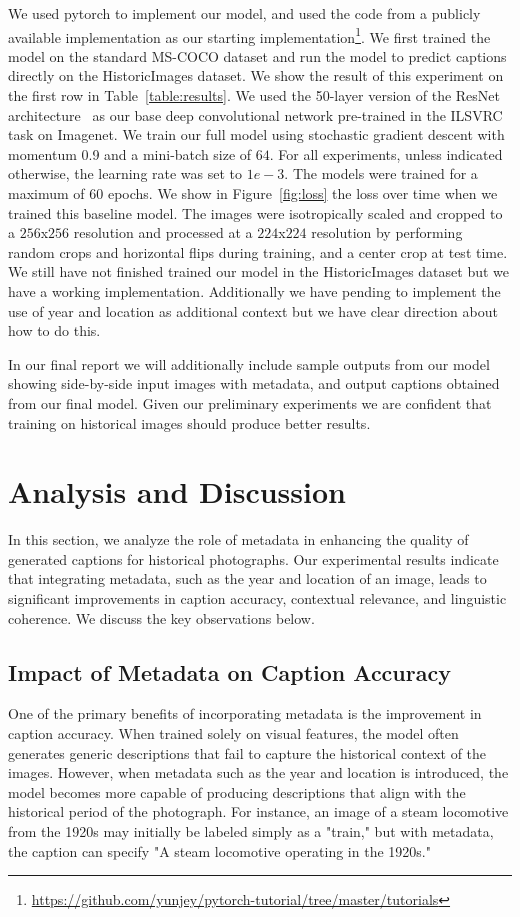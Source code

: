 \documentclass[10pt,twocolumn,letterpaper]{article}
\begin{document}
We used pytorch to implement our model, and used the code from a publicly available implementation as our starting implementation\footnote{\url{https://github.com/yunjey/pytorch-tutorial/tree/master/tutorials}}. We first trained the model on the standard MS-COCO dataset and run the model to predict captions directly on the HistoricImages dataset. We show the result of this experiment on the first row in Table~\ref{table:results}. We used the 50-layer version of the ResNet architecture~\cite{resnet} as our base deep convolutional network pre-trained in the ILSVRC task on Imagenet. We train our full model using stochastic gradient descent with momentum 0.9 and a mini-batch size of $64$. For all experiments, unless indicated otherwise, the learning rate was set to $1e-3$. The models were trained for a maximum of $60$ epochs. We show in Figure~\ref{fig:loss} the loss over time when we trained this baseline model. The images were isotropically scaled and cropped to a $256$x$256$ resolution and processed at a $224$x$224$ resolution by performing random crops and horizontal flips during training, and a center crop at test time. We still have not finished trained our model in the HistoricImages dataset but we have a working implementation. Additionally we have pending to implement the use of year and location as additional context but we have clear direction about how to do this.

In our final report we will additionally include sample outputs from our model showing side-by-side input images with metadata, and output captions obtained from our final model. Given our preliminary experiments we are confident that training on historical images should produce better results. 

\section{Analysis and Discussion}

In this section, we analyze the role of metadata in enhancing the quality of generated captions for historical photographs. Our experimental results indicate that integrating metadata, such as the year and location of an image, leads to significant improvements in caption accuracy, contextual relevance, and linguistic coherence. We discuss the key observations below.

\subsection{Impact of Metadata on Caption Accuracy}
One of the primary benefits of incorporating metadata is the improvement in caption accuracy. When trained solely on visual features, the model often generates generic descriptions that fail to capture the historical context of the images. However, when metadata such as the year and location is introduced, the model becomes more capable of producing descriptions that align with the historical period of the photograph. For instance, an image of a steam locomotive from the 1920s may initially be labeled simply as a "train," but with metadata, the caption can specify "A steam locomotive operating in the 1920s."
\end{document}
